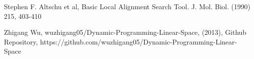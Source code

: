 \documentclass{article}
\begin{document}
\begin{thebibliography}{9}

	Stephen F. Altschu et al,
	Basic Local Alignment Search Tool.
	J. Mol. Biol. (1990) 215, 403-410 
	
  Zhigang Wu,
  wuzhigang05/Dynamic-Programming-Linear-Space,
  (2013),
  Github Repository,
  https://github.com/wuzhigang05/Dynamic-Programming-Linear-Space

\end{thebibliography}
\end{document}
